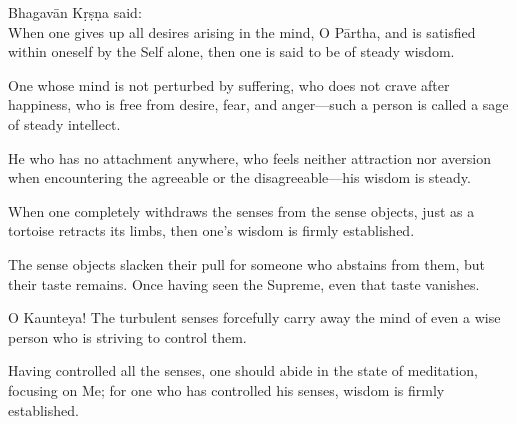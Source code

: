 {\hspace*{1em}Bhagavān Kṛṣṇa said: \\
When one gives up all desires arising in the mind, O Pārtha, and is satisfied within oneself by the Self alone, then one is said to be of steady wisdom.}

{One whose mind is not perturbed by suffering, who does not crave after happiness, who is free from desire, fear, and anger---such a person is called a sage of steady intellect.}

{He who has no attachment anywhere, who feels neither attraction nor aversion when encountering the agreeable or the disagreeable---his wisdom is steady.}

{When one completely withdraws the senses from the sense objects, just as a tortoise retracts its limbs, then one's wisdom is firmly established.}

{The sense objects slacken their pull for someone who abstains from them, but their taste remains. Once having seen the Supreme, even that taste vanishes.}

{O Kaunteya! The turbulent senses forcefully carry away the mind of even a wise person who is striving to control them.}

{Having controlled all the senses, one should abide in the state of meditation, focusing on Me; for one who has controlled his senses, wisdom is firmly established.}

